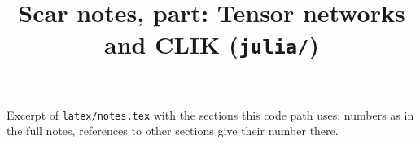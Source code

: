 \documentclass[11pt,a4paper]{article}
\title{Scar notes, part: Tensor networks and CLIK (\texttt{julia/})}
\begin{document}
\maketitle
\noindent Excerpt of \texttt{latex/notes.tex} with the sections this code path uses; numbers as in the full notes, references to other sections give their number there.

\tableofcontents

\end{document}
